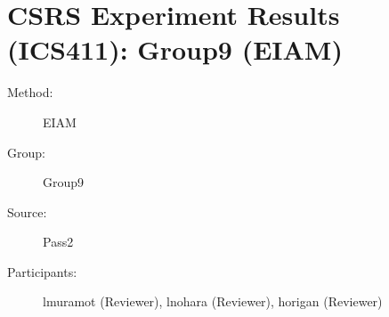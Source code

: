 \chapter {CSRS Experiment Results (ICS411): Group9 (EIAM)}
\small

\begin{description}
\item [Method:] EIAM
\item [Group:] Group9
\item [Source:] Pass2
\item [Participants:] lmuramot (Reviewer), lnohara (Reviewer), horigan (Reviewer)
\end{description}
